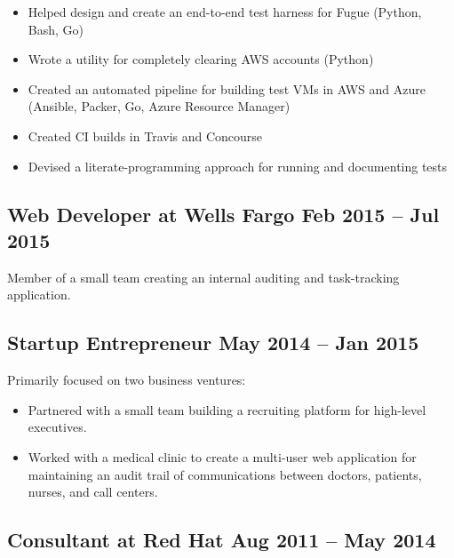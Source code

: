 \documentclass[12pt]{article}
\begin{document}
\begin{itemize}
\item Helped design and create an end-to-end test harness for Fugue (Python,
  Bash, Go)
\item Wrote a utility for completely clearing AWS accounts (Python)
\item Created an automated pipeline for building test VMs in AWS and Azure
  (Ansible, Packer, Go, Azure Resource Manager)
\item Created CI builds in Travis and Concourse
\item Devised a literate-programming approach for running and documenting tests
\end{itemize}

     
   

\subsection*{Web Developer at Wells Fargo \hfill Feb 2015 -- Jul 2015}

Member of a small team creating an internal auditing and task-tracking
application.

    

\subsection*{Startup Entrepreneur \hfill May 2014 -- Jan 2015}

Primarily focused on two business ventures:

\begin{itemize}
\item Partnered with a small team building a recruiting platform for
  high-level executives.

\item Worked with a medical clinic to create a multi-user web application for
  maintaining an audit trail of communications between doctors, patients,
  nurses, and call centers.
\end{itemize}

     
\tag{\LaTeX}

\subsection*{Consultant at Red Hat \hfill Aug 2011 -- May 2014}
\end{document}
